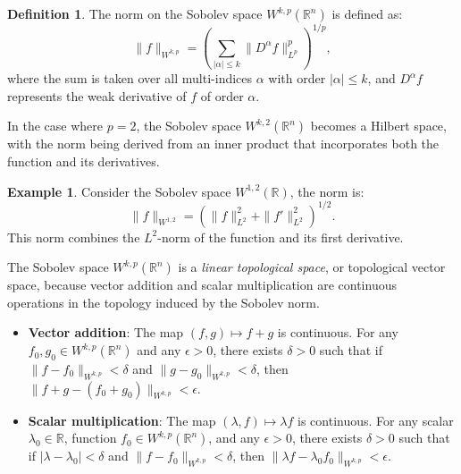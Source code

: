 \documentclass[12pt, reqno]{amsart}
\theoremstyle{definition}
\newtheorem{definition}[theorem]{Definition}
\newtheorem{example}[theorem]{Example}
\numberwithin{equation}{section}
\newcommand{\dR}{{\mathbb R}}
\begin{document}
\begin{definition}
The norm on the Sobolev space \(W^{k, p}(\dR^n)\) is defined as:
\[
\|f\|_{W^{k, p}} = \left( \sum_{|\alpha| \leq k} \|D^\alpha f\|_{L^p}^p \right)^{1/p},
\]
where the sum is taken over all multi-indices \(\alpha\) with order \(|\alpha| \leq k\), and \(D^\alpha f\) represents the weak derivative of \(f\) of order \(\alpha\).
\end{definition}

In the case where \(p = 2\), the Sobolev space \(W^{k, 2}(\dR^n)\) becomes a Hilbert space, with the norm being derived from an inner product that incorporates both the function and its derivatives.

\begin{example}
Consider the Sobolev space \(W^{1, 2}(\dR)\), the norm is:
\[
\|f\|_{W^{1, 2}} = \left( \|f\|_{L^2}^2 + \|f'\|_{L^2}^2 \right)^{1/2}.
\]
This norm combines the \(L^2\)-norm of the function and its first derivative.
\end{example}

The Sobolev space \(W^{k, p}(\dR^n)\) is a \emph{linear topological space}, or topological vector space, because vector addition and scalar multiplication are continuous operations in the topology induced by the Sobolev norm.

\begin{itemize}
    \item \textbf{Vector addition}: The map \((f, g) \mapsto f + g\) is continuous. For any \(f_0, g_0 \in W^{k, p}(\dR^n)\) and any \(\epsilon > 0\), there exists \(\delta > 0\) such that if \(\|f - f_0\|_{W^{k, p}} < \delta\) and \(\|g - g_0\|_{W^{k, p}} < \delta\), then \(\|f + g - (f_0 + g_0)\|_{W^{k, p}} < \epsilon\).
    
    \item \textbf{Scalar multiplication}: The map \((\lambda, f) \mapsto \lambda f\) is continuous. For any scalar \(\lambda_0 \in \dR\), function \(f_0 \in W^{k, p}(\dR^n)\), and any \(\epsilon > 0\), there exists \(\delta > 0\) such that if \(|\lambda - \lambda_0| < \delta\) and \(\|f - f_0\|_{W^{k, p}} < \delta\), then \(\|\lambda f - \lambda_0 f_0\|_{W^{k, p}} < \epsilon\).
\end{itemize}
\end{document}
